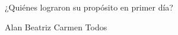 ¿Quiénes lograron su prop\'osito en primer d\'ia?

\begin{oneparchoices}\footnotesize
    \choice Alan
    \CorrectChoice Beatriz
    \choice Carmen
    \choice Todos
\end{oneparchoices}